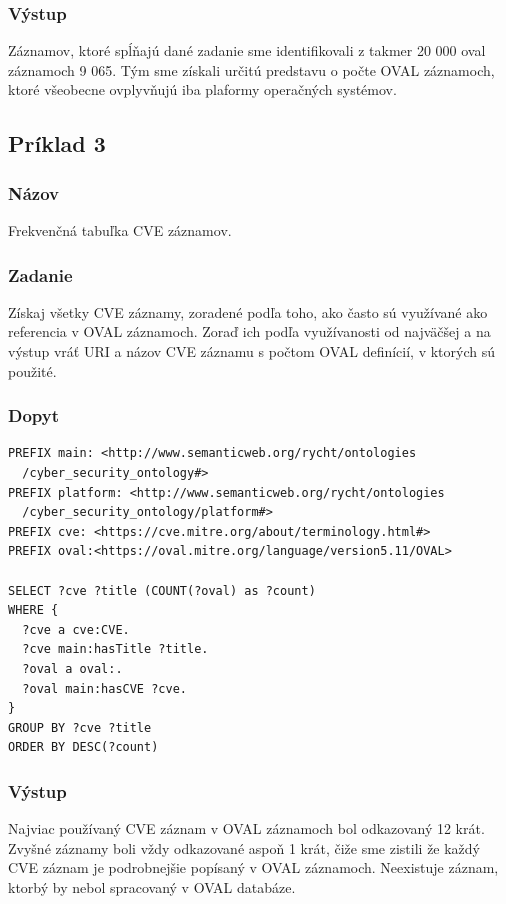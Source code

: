 \documentclass[12pt, a4paper, oneside]{book}
\begin{document}
\subsubsection*{Výstup}
Záznamov, ktoré spĺňajú dané zadanie sme identifikovali z takmer 20 000 oval záznamoch 9 065. Tým sme získali určitú predstavu o počte OVAL záznamoch, ktoré všeobecne ovplyvňujú iba plaformy operačných systémov.


\subsection*{Príklad 3}
\label{sec:priklad3}
\subsubsection*{Názov}
Frekvenčná tabuľka CVE záznamov.

\subsubsection*{Zadanie}
Získaj všetky CVE záznamy, zoradené podľa toho, ako často sú využívané ako referencia v OVAL záznamoch. Zoraď ich podľa využívanosti od najväčšej a na výstup vráť URI a názov CVE záznamu s počtom OVAL definícií, v ktorých sú použité.

\subsubsection*{Dopyt}
\begin{verbatim}
PREFIX main: <http://www.semanticweb.org/rycht/ontologies
  /cyber_security_ontology#>
PREFIX platform: <http://www.semanticweb.org/rycht/ontologies
  /cyber_security_ontology/platform#>
PREFIX cve: <https://cve.mitre.org/about/terminology.html#>
PREFIX oval:<https://oval.mitre.org/language/version5.11/OVAL>

SELECT ?cve ?title (COUNT(?oval) as ?count)
WHERE {
  ?cve a cve:CVE.
  ?cve main:hasTitle ?title.
  ?oval a oval:.
  ?oval main:hasCVE ?cve.
} 
GROUP BY ?cve ?title
ORDER BY DESC(?count)
\end{verbatim}


\subsubsection*{Výstup}
Najviac používaný CVE záznam v OVAL záznamoch bol odkazovaný 12 krát. Zvyšné záznamy boli vždy odkazované aspoň 1 krát, čiže sme zistili že každý CVE záznam je podrobnejšie popísaný v OVAL záznamoch. Neexistuje záznam, ktorbý by nebol spracovaný v OVAL databáze.
\end{document}
